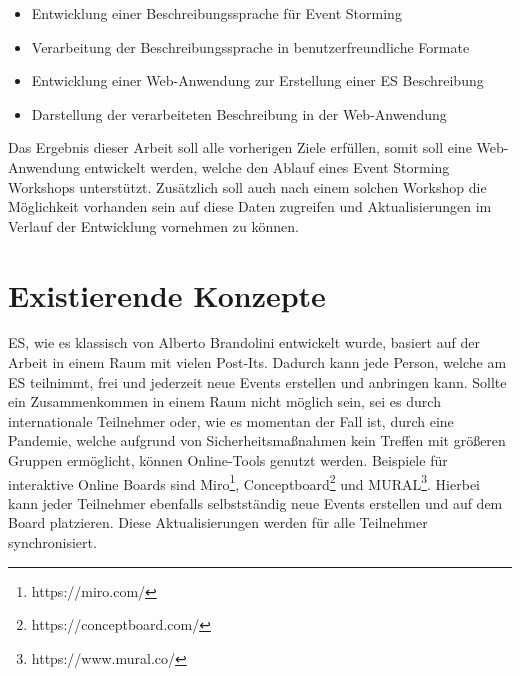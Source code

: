 \begin{itemize}
    \item Entwicklung einer Beschreibungssprache für Event Storming
    \item Verarbeitung der Beschreibungssprache in benutzerfreundliche Formate
    \item Entwicklung einer Web-Anwendung zur Erstellung einer \ac{ES} Beschreibung
    \item Darstellung der verarbeiteten Beschreibung in der Web-Anwendung
\end{itemize}

Das Ergebnis dieser Arbeit soll alle vorherigen Ziele erfüllen, somit soll eine Web-Anwendung entwickelt werden,
welche den Ablauf eines Event Storming Workshops unterstützt.
Zusätzlich soll auch nach einem solchen Workshop die Möglichkeit vorhanden sein auf diese Daten zugreifen und Aktualisierungen
im Verlauf der Entwicklung vornehmen zu können.


\section{Existierende Konzepte}\label{sec:existierende-konzepte}
\ac{ES}, wie es klassisch von Alberto Brandolini entwickelt wurde, basiert auf der Arbeit in einem Raum mit vielen Post-Its.
Dadurch kann jede Person, welche am \ac{ES} teilnimmt, frei und jederzeit neue Events erstellen und anbringen kann.
Sollte ein Zusammenkommen in einem Raum nicht möglich sein, sei es durch internationale Teilnehmer oder, wie es momentan der Fall ist,
durch eine Pandemie, welche aufgrund von Sicherheitsmaßnahmen kein Treffen mit größeren Gruppen ermöglicht, können Online-Tools genutzt werden.
Beispiele für interaktive Online Boards sind Miro\footnote{https://miro.com/}, Conceptboard\footnote{https://conceptboard.com/} und MURAL\footnote{https://www.mural.co/}.
Hierbei kann jeder Teilnehmer ebenfalls selbstständig neue Events erstellen und auf dem Board platzieren.
Diese Aktualisierungen werden für alle Teilnehmer synchronisiert.


